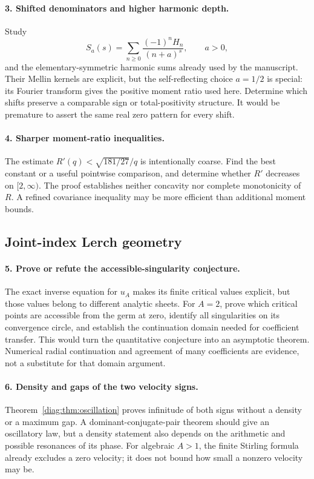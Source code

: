 \paragraph{3. Shifted denominators and higher harmonic depth.}
Study
\[
 S_a(s)=\sum_{n\ge0}\frac{(-1)^nH_n}{(n+a)^s},
 \qquad a>0,
\]
and the elementary-symmetric harmonic sums already used by the
manuscript. Their Mellin kernels are explicit, but the self-reflecting
choice $a=1/2$ is special: its Fourier transform gives the positive
moment ratio used here. Determine which shifts preserve a comparable
sign or total-positivity structure. It would be premature to assert
the same real zero pattern for every shift.

\paragraph{4. Sharper moment-ratio inequalities.}
The estimate $R'(q)<\sqrt{181/27}/q$ is intentionally coarse.
Find the best constant or a useful pointwise comparison, and determine
whether $R'$ decreases on $[2,\infty)$. The proof establishes neither
concavity nor complete monotonicity of $R$. A refined covariance
inequality may be more efficient than additional moment bounds.

\subsection{Joint-index Lerch geometry}

\paragraph{5. Prove or refute the accessible-singularity conjecture.}
The exact inverse equation for $u_A$ makes its finite critical values
explicit, but those values belong to different analytic sheets.
For $A=2$, prove which critical points are accessible from the germ
at zero, identify all singularities on its convergence circle, and
establish the continuation domain needed for coefficient transfer.
This would turn the quantitative conjecture into an asymptotic theorem.
Numerical radial continuation and agreement of many coefficients
are evidence, not a substitute for that domain argument.

\paragraph{6. Density and gaps of the two velocity signs.}
Theorem~\ref{diag:thm:oscillation} proves infinitude of both signs without
a density or a maximum gap. A dominant-conjugate-pair theorem should
give an oscillatory law, but a density statement also depends on the
arithmetic and possible resonances of its phase. For algebraic
$A>1$, the finite Stirling formula already excludes a zero velocity;
it does not bound how small a nonzero velocity may be.

